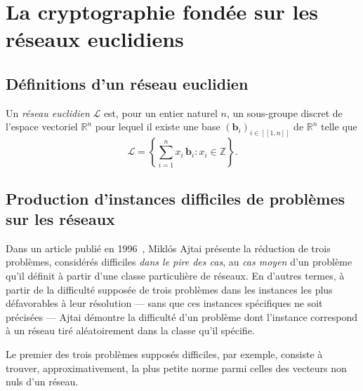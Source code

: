 
\section{La cryptographie fondée sur les réseaux euclidiens} %
\label{sec:reseaux}




\subsection{Définitions d’un réseau euclidien}
Un \emph{réseau euclidien} $\mathcal{L}$ est, pour un entier naturel $n$, un sous-groupe discret de l’espace vectoriel $\mathbb{R}^n$ pour lequel il existe une base $(\mathbf{b}_i)_{i\in[\![1, n]\!]}$ de $\mathbb{R}^n$ telle que
\[
\mathcal{L} =\left\{ \sum^n_{i=1} x_i\,\mathbf{b}_i : x_i \in \mathbb Z\right\}\text{.}
\]


\subsection{Production d'instances difficiles de problèmes sur les réseaux}

Dans un article publié en 1996~\cite{STOC:Ajtai96}, Miklós Ajtai présente la réduction de trois problèmes, considérés
difficiles \emph{dans le pire des cas}, au \emph{cas moyen} d’un problème qu’il définit à partir
d’une classe particulière de réseaux.
En d’autres termes, à partir de la difficulté supposée de trois problèmes dans les instances les
plus défavorables à leur résolution --- sans que ces instances spécifiques ne soit précisées ---
Ajtai démontre la difficulté d’un problème dont l’instance correspond à un réseau tiré aléatoirement
dans la classe qu’il spécifie.

Le premier des trois problèmes supposés difficiles, par exemple, consiste à trouver,
approximativement, la plus petite norme parmi celles des vecteurs non nuls d’un réseau.


